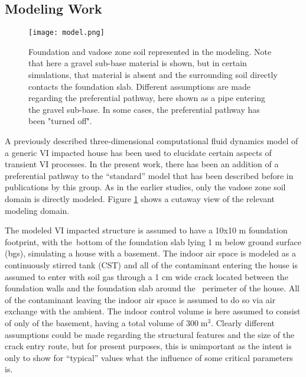 \documentclass[journal=esthag,manuscript=article]{achemso}
\begin{document}
\subsection{Modeling Work}

\begin{figure}[htb!]
 \caption{Foundation and vadose zone soil represented in the modeling. Note that here a gravel sub-base material is shown, but in certain simulations, that material is absent and the surrounding soil directly contacts the foundation slab.  Different assumptions are made regarding the preferential pathway, here shown as a pipe entering the gravel sub-base. In some cases, the preferential pathway has been "turned off".}\label{fig:model}
 \texttt{[image: model.png]}
\end{figure}

A previously described three-dimensional computational fluid dynamics model of a generic VI impacted house has been used to elucidate certain aspects of transient VI processes.
In the present work, there has been an addition of a preferential pathway to the “standard” model that has been described before in publications by this group\cite{shen_influence_2013,yao_investigating_2017,yao_three-dimensional_2017}.
As in the earlier studies, only the vadose zone soil domain is directly modeled.
Figure \ref{fig:model} shows a cutaway view of the relevant modeling domain.\par

The modeled VI impacted structure is assumed to have a 10x10 m foundation footprint, with the bottom of the foundation slab lying 1 m below ground surface (bgs), simulating a house with a basement.
The indoor air space is modeled as a continuously stirred tank (CST)\cite{u.s._environmental_protection_agency_oswer_2015} and all of the contaminant entering the house is assumed to enter with soil gas through a 1 cm wide crack located between the foundation walls and the foundation slab around the  perimeter of the house.
All of the contaminant leaving the indoor air space is assumed to do so via air exchange with the ambient.
The indoor control volume is here assumed to consist of only of the basement, having a total volume of $300 \; \mathrm{m^3}$.
Clearly different assumptions could be made regarding the structural features and the size of the crack entry route, but for present purposes, this is unimportant as the intent is only to show for “typical” values what the influence of some critical parameters is.\par
\end{document}
